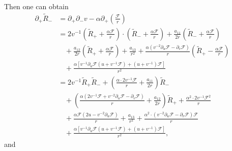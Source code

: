 \documentclass[10pt,leqno]{amsart}
\numberwithin{equation}{section}
\begin{document}
Then one can obtain
\begin{equation} \label{partial R 1}
	\begin{aligned}
		\partial_{+} \tilde{R}_{-} 
		& =  \partial_{+} \partial_{-} v - \alpha \partial_{+} \left( \frac{ \mathcal{F}}{r} \right) \\
		& = 2v^{-1} \left( \tilde{R}_{+ } + \frac{\alpha \mathcal{F}}{r} \right) \cdot \left( \tilde{R}_{-} + \frac{\alpha \mathcal{F}}{r} \right)  + \frac{a_{11}}{2r} \left(\tilde{R}_{-} + \frac{\alpha \mathcal{F}}{r} \right)  \\
		& \ \ \ \  + \frac{a_{12}}{2r} \left(\tilde{R}_{+ } + \frac{\alpha \mathcal{F}}{r} \right) +\frac{a_{13}}{r^{2}} + \frac{\alpha( v^{-2} \partial_{u} \mathcal{F} - \partial_{v} \mathcal{F}  )}{r} \left( \tilde{R}_{+ } - \frac{\alpha \mathcal{F}}{r} \right) \\
		& \ \ \ \ + \frac{\alpha[v^{-1} \partial_{u} \mathcal{F}  (u+v^{-1}\mathcal{F}  ) + (u+v^{-1})\mathcal{F} ] }{r^2} \\
		& = 2v^{-1}\tilde{R}_{+ } \tilde{R}_{-} + \left( \frac{\alpha \cdot 2v^{-1} \mathcal{F} }{r} +\frac{a_{11}}{2r} \right) \tilde{R}_{-} \\
		& \ \ \ \  +\left( \frac{\alpha ( 2v^{-1}\mathcal{F} + v^{-2}\partial_{u}\mathcal{F} - \partial_{v}\mathcal{F})}{r} + \frac{a_{12}}{2r} \right)  \tilde{R}_{+ }  + \frac{\alpha^{2} \cdot 2v^{-1} \mathcal{F}^{2} }{r} \\
		& \ \ \ \ + \frac{\alpha \mathcal{F} (2u - v^{-2} \partial_{u}\mathcal{F} ) }{r} +\frac{a_{13}}{r^{2}}   + \frac{\alpha^{2} \cdot ( v^{-2} \partial_{u} \mathcal{F} - \partial_{v} \mathcal{F}  )  \mathcal{F} }{r} \\
		& \ \ \ \ + \frac{\alpha[v^{-1} \partial_{u} \mathcal{F}  (u+v^{-1}\mathcal{F}  ) + (u+v^{-1})\mathcal{F} ] }{r^2},
	\end{aligned}
\end{equation}	
and
\end{document}
